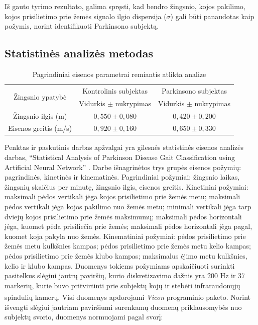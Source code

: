 \documentclass[]{vgtuef}
\begin{document}
Iš gauto tyrimo rezultato, galima spręsti, kad bendro žingsnio, kojos pakilimo, kojos prisilietimo prie žemės signalo ilgio dispersija ($\sigma$) gali būti panaudotas kaip požymis, norint identifikuoti Parkinsono subjektą.

\subsection{Statistinės analizės metodas}


\begin{table}
	\centering
	\renewcommand{\arraystretch}{1.3}
	\caption{Pagrindiniai eisenos parametrai remiantis atlikta analize \cite{6151536}}
	\label{table:statistics_st_wa}
	\begin{tabular}{|c|c|c|} \hline
		\multirow{2}{*}{Žingsnio ypatybė} & Kontrolinis subjektas & Parkinsono subjektas \\ \cline{2-3}
			& Vidurkis $\pm$ nukrypimas & Vidurkis $\pm$ nukrypimas \\ \hline
		Žingsnio ilgis (m)    & $0,550\pm0,080$ & $0,420\pm0,200$ \\ \hline
		Eisenos greitis (m/s) & $0,920\pm0,160$ & $0,650\pm0,330$ \\ \hline
	\end{tabular}
\end{table}

Penktas ir paskutinis darbas apžvalgai yra gilesnės statistinės eisenos analizės darbas, ``Statistical Analysis of Parkinson Disease Gait Classification using Artificial Neural Network'' \cite{6151536}. Darbe išnagrinėtos trys grupės eisenos požymių: pagrindinės, kinetinės ir kinematinės. Pagrindiniai požymiai: žingsnio laikas, žingsnių skaičius per minutę, žingsnio ilgis, eisenos greitis. Kinetiniai požymiai: maksimali pėdos vertikali jėga kojos prisilietimo prie žemės metu; maksimali pėdos vertikali jėga kojos pakilimo nuo žemės metu; minimali vertikali jėga tarp dviejų kojos prisilietimo prie žemės maksimumų; maksimali pėdos horizontali jėga, kuomet pėda prisiliečia prie žemės; maksimali pėdos horizontali jėga pagal, kuomet koja pakyla nuo žemės. Kinematiniai požymiai: pėdos prisilietimo prie žemės metu kulkšnies kampas; pėdos prisilietimo prie žemės metu kelio kampas; pėdos prisilietimo prie žemės klubo kampas; maksimalus ėjimo metu kulkšnies, kelio ir klubo kampas. Duomenys tokiems požymiams apskaičiuoti surinkti pasitelkus slėgiui jautrų paviršių, kurio diskretizavimo dažnis yra $200$ Hz ir $37$ markerių, kurie buvo pritvirtinti prie subjektų kojų ir stebėti infraraudonųjų spindulių kamerų. Visi duomenys apdorojami \textit{Vicon\textsuperscript{\textregistered}} programinio paketo. Norint išvengti slėgiui jautriam paviršiumi surenkamų duomenų priklausomybės nuo subjektų svorio, duomenys normuojami pagal svorį:
\end{document}
